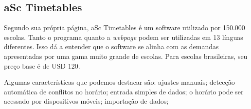 \documentclass[12pt,a4paper]{article}
\begin{document}
		\subsection{aSc Timetables}

			\par Segundo sua própria página, aSc Timetables é um software utilizado por 150.000 escolas. Tanto o programa quanto a \textit{webpage} podem ser utilizadas em 13 línguas diferentes. Isso dá a entender que o software se alinha com as demandas apresentadas por uma gama muito grande de escolas. Para escolas brasileiras, seu preço base é de USD 120.

			\par Algumas características que podemos destacar são: ajustes manuais; detecção automática de conflitos no horário; entrada simples de dados;  o horário pode ser acessado por dispositivos móveis; importação de dados;
\end{document}
